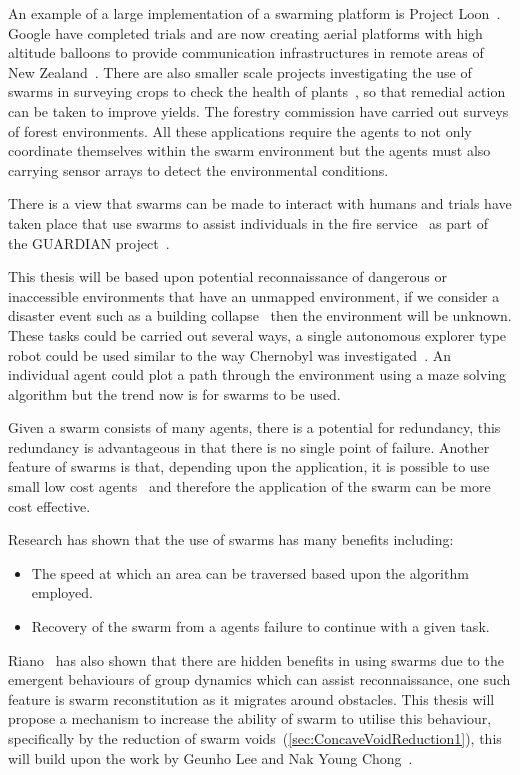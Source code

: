 An example of a large implementation of a swarming platform is Project Loon~\cite{KS:ND, G:13, RAV:13}. Google have completed trials and are now creating aerial platforms with high altitude balloons to provide communication infrastructures in remote areas of New Zealand~\cite{CBS:13, NZH:13}. There are also smaller scale projects investigating the use of swarms in surveying crops to check the health of plants~\cite{BSB:15}, so that remedial action can be taken to improve yields. The forestry commission have carried out surveys of forest environments. All these applications require the agents to not only coordinate themselves within the swarm environment but the agents must also carrying sensor arrays to detect the environmental conditions.

There is a view that swarms can be made to interact with humans and trials have taken place that use swarms to assist individuals in the fire service~\cite{PAWN:11} as part of the GUARDIAN project~\cite{SALGVPJ:08}. 

This thesis will be based upon potential reconnaissance of dangerous or inaccessible environments that have an unmapped environment, if we consider a disaster event such as a building collapse~\cite{STO:05} then the environment will be unknown. These tasks could be carried out several ways, a single autonomous explorer type robot could be used similar to the way Chernobyl was investigated~\cite{JA:98}. An individual agent could plot a path through the environment using a maze solving algorithm but the trend now is for swarms to be used.  

Given a swarm consists of many agents, there is a potential for redundancy, this redundancy is advantageous in that there is no single point of failure. Another feature of swarms is that, depending upon the application, it is possible to use small low cost agents~\cite{STO:05} and therefore the application of the swarm can be more cost effective.

Research has shown that the use of swarms has many benefits including: 
\begin{itemize} 
\item The speed at which an area can be traversed based upon the algorithm employed.
\item Recovery of the swarm from a agents failure to continue with a given task.
\end{itemize} 

Riano~\cite{RM:11} has also shown that there are hidden benefits in using swarms due to the emergent behaviours of group dynamics which can assist reconnaissance, one such feature is swarm reconstitution as it migrates around obstacles. This thesis will propose a mechanism to increase the ability of swarm to utilise this behaviour, specifically by the reduction of swarm voids~(\autoref{sec:ConcaveVoidReduction1}), this will build upon the work by Geunho Lee and Nak Young Chong~\cite{GN:08}.

